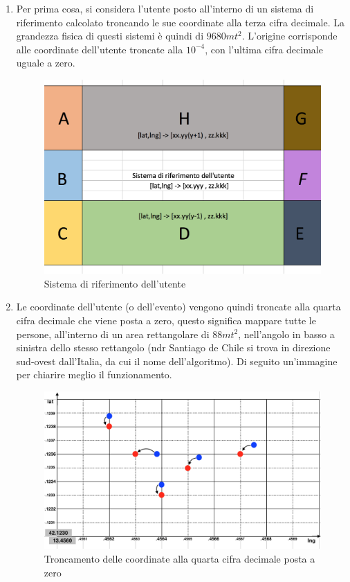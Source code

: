 \begin{enumerate}
\item Per prima cosa, si considera l'utente posto all'interno di un sistema di riferimento calcolato troncando le sue coordinate alla terza cifra decimale. La grandezza fisica di questi sistemi è quindi di $ 9680mt^{2} $. L'origine corrisponde alle coordinate dell'utente troncate alla $10^{-4} $, con l'ultima cifra decimale uguale a zero.
\begin{figure}[H]
	\centering
	\includegraphics[scale=0.6]{Implementazione/sis1.png}
	\caption{Sistema di riferimento dell'utente}
	\label{fig:sis}
\end{figure}
\newpage
\item Le coordinate dell'utente (o dell'evento) vengono quindi troncate alla quarta cifra decimale che viene posta a zero, questo significa mappare tutte le persone, all'interno di un area rettangolare di  $88 mt^{2}$, nell'angolo in basso a sinistra dello stesso rettangolo (ndr Santiago de Chile si trova in direzione sud-ovest dall'Italia, da cui il nome dell'algoritmo). Di seguito un'immagine per chiarire meglio il funzionamento.

\begin{figure}[H]
	\centering
	\includegraphics[scale=0.6]{Implementazione/mapping.png}
	\caption{Troncamento delle coordinate alla quarta cifra decimale posta a zero}
	\label{fig:mapping}
\end{figure}


\end{enumerate}
